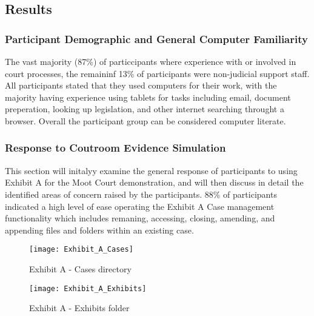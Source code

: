\subsection{Results}
\subsubsection{Participant Demographic and General Computer Familiarity}
The vast majority (87\%) of particcipants where experience with or involved in court processes, the remaininf 13\% of participants were non-judicial support staff. All participants stated that they used computers for their work, with the majority having experience using tablets for tasks including email, document preperation, looking up legislation, and other internet searching throught a browser.
Overall the participant group can be considered computer literate.

\subsubsection{Response to Coutroom Evidence Simulation}
This section will initalyy examine the general response of participants to using Exhibit A for the Moot Court demonstration, and will then discuss in detail the identified areas of concern raised by the participants.
88\% of participants indicated a high level of ease operating the Exhibit A Case management functionality which includes remaning, accessing, closing, amending, and appending files and folders within an existing case. 

    







\begin{figure}[h]
\texttt{[image: Exhibit\_A\_Cases]}
\caption{Exhibit A - Cases directory}
\label{fig:exhibit_a_cases_Directory}
\end{figure}


\begin{figure}[h]
\texttt{[image: Exhibit\_A\_Exhibits]}
\caption{Exhibit A - Exhibits folder}
\label{fig:exhibit_a_exhibits_folder}
\end{figure}


